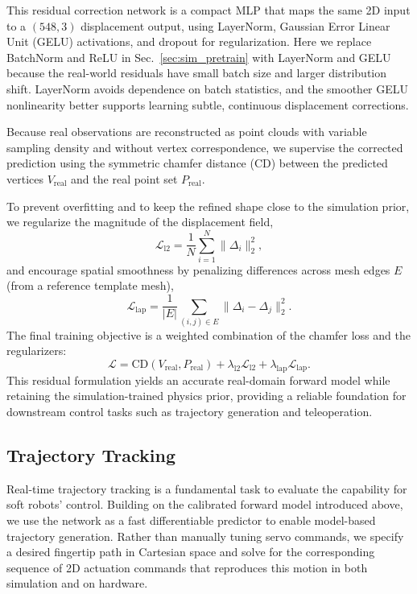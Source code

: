 \documentclass[letterpaper, 10 pt, conference]{ieeeconf}  %
\begin{document}
This residual correction network is a compact MLP that maps the same 2D input to a $(548,3)$ displacement output, using LayerNorm, Gaussian Error Linear Unit (GELU) activations, and dropout for regularization. Here we replace BatchNorm and ReLU in Sec.~\ref{sec:sim_pretrain} with LayerNorm and GELU because the real-world residuals have small batch size and larger distribution shift. LayerNorm avoids dependence on batch statistics, and the smoother GELU nonlinearity better supports learning subtle, continuous displacement corrections. 

Because real observations are reconstructed as point clouds with variable sampling density and without vertex correspondence, we supervise the corrected prediction using the symmetric chamfer distance (CD) between the predicted vertices $V_{\text{real}}$ and the real point set $P_{\text{real}}$.

To prevent overfitting and to keep the refined shape close to the simulation prior, we regularize the magnitude of the displacement field,
\[
\mathcal{L}_{\text{l2}} = \frac{1}{N}\sum_{i=1}^{N}\|\Delta_i\|_2^2,
\]
and encourage spatial smoothness by penalizing differences across mesh edges $E$ (from a reference template mesh),
\[
\mathcal{L}_{\text{lap}} = \frac{1}{|E|}\sum_{(i,j)\in E}\|\Delta_i-\Delta_j\|_2^2.
\]
The final training objective is a weighted combination of the chamfer loss and the regularizers:
\[
\mathcal{L}=\mathrm{CD}\!\left(V_{\text{real}},P_{\text{real}}\right)+\lambda_{\text{l2}}\mathcal{L}_{\text{l2}}+\lambda_{\text{lap}}\mathcal{L}_{\text{lap}}.
\]
This residual formulation yields an accurate real-domain forward model while retaining the simulation-trained physics prior, providing a reliable foundation for downstream control tasks such as trajectory generation and teleoperation.

\subsection{Trajectory Tracking}
\label{sec:traj_gen}

Real-time trajectory tracking is a fundamental task to evaluate the capability for soft robots' control. 
Building on the calibrated forward model introduced above, we use the network as a fast differentiable predictor to enable model-based trajectory generation. Rather than manually tuning servo commands, we specify a desired fingertip path in Cartesian space and solve for the corresponding sequence of 2D actuation commands that reproduces this motion in both simulation and on hardware.
\end{document}
